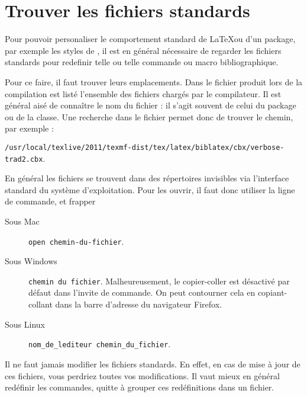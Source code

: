 \section{Trouver les fichiers standards}\label{trouverfichier}

Pour pouvoir personaliser le comportement standard de \LaTeX ou d'un package, par exemple les styles de , il est en général nécessaire de regarder les fichiers standards pour redefinir telle ou telle commande ou macro bibliographique. 

Pour ce faire, il faut trouver leurs emplacements. Dans le fichier  produit lors de la compilation est listé l'ensemble des fichiers chargés par le compilateur. Il est général aisé de connaître le nom du fichier : il s'agit souvent de celui du package ou de la classe. Une recherche dans le fichier permet donc de trouver le chemin, par exemple : 

\verb|/usr/local/texlive/2011/texmf-dist/tex/latex/biblatex/cbx/verbose-trad2.cbx|.

En général les fichiers se trouvent dans des répertoires invisibles via l'interface standard du système d'exploitation. Pour les ouvrir, il faut donc utiliser la ligne de commande, et frapper 
\begin{description}
\item[Sous Mac]\verb|open chemin-du-fichier|.
\item[Sous Windows] \verb|chemin du fichier|.  Malheureusement, le copier-coller est désactivé par défaut dans l'invite de commande. On peut contourner cela en copiant-collant dans la barre d'adresse du navigateur Firefox.
\item[Sous Linux] \verb|nom_de_lediteur chemin_du_fichier|.
\end{description}
\begin{attention}
Il ne faut jamais modifier les fichiers standards. En effet, en cas de mise à jour de ces fichiers, vous perdriez toutes vos modifications. Il vaut mieux en général redéfinir les commandes, quitte à grouper ces redéfinitions dans un fichier.
\end{attention}

